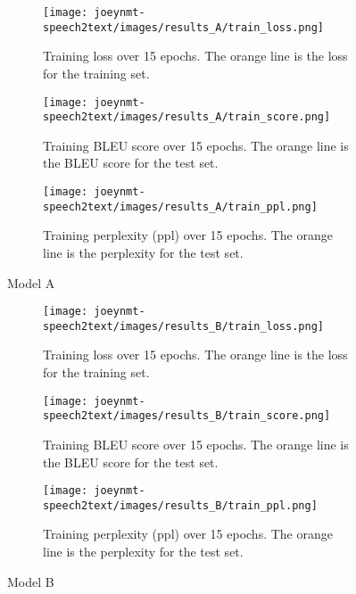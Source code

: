 \documentclass[11pt,a4paper]{article}
\begin{document}
\begin{figure*}[htb]
    \begin{subfigure}[b]{0.32\textwidth}
        \centering
        \texttt{[image: joeynmt-speech2text/images/results\_A/train\_loss.png]}
        \caption{Training loss over 15 epochs. The orange line is the loss for the training set.}
        \label{fig:train_loss_a}
    \end{subfigure}
    \hfill
    \begin{subfigure}[b]{0.32\textwidth}
        \centering
        \texttt{[image: joeynmt-speech2text/images/results\_A/train\_score.png]}
        \caption{Training BLEU score over 15 epochs. The orange line is the BLEU score for the test set.}
        \label{fig:train_score_a}
    \end{subfigure}
    \hfill
    \begin{subfigure}[b]{0.32\textwidth}
        \centering
        \texttt{[image: joeynmt-speech2text/images/results\_A/train\_ppl.png]}
        \caption{Training perplexity (ppl) over 15 epochs. The orange line is the perplexity for the test set.}
        \label{fig:train_ppl_a}
    \end{subfigure}
    \caption{Model A}
    \label{fig:model_a_loss_ppl_score}
\end{figure*}

\begin{figure*}[ht]
    \begin{subfigure}[b]{0.32\textwidth}
        \centering
        \texttt{[image: joeynmt-speech2text/images/results\_B/train\_loss.png]}
        \caption{Training loss over 15 epochs. The orange line is the loss for the training set.}
        \label{fig:train_loss_b}
    \end{subfigure}
    \hfill
    \begin{subfigure}[b]{0.32\textwidth}
        \centering
        \texttt{[image: joeynmt-speech2text/images/results\_B/train\_score.png]}
        \caption{Training BLEU score over 15 epochs. The orange line is the BLEU score for the test set.}
        \label{fig:train_score_b}
    \end{subfigure}
    \hfill
    \begin{subfigure}[b]{0.32\textwidth}
        \centering
        \texttt{[image: joeynmt-speech2text/images/results\_B/train\_ppl.png]}
        \caption{Training perplexity (ppl) over 15 epochs. The orange line is the perplexity for the test set.}
        \label{fig:train_ppl_b}
    \end{subfigure}
    \caption{Model B}
    \label{fig:model_b_loss_ppl_score}
\end{figure*}
\end{document}
